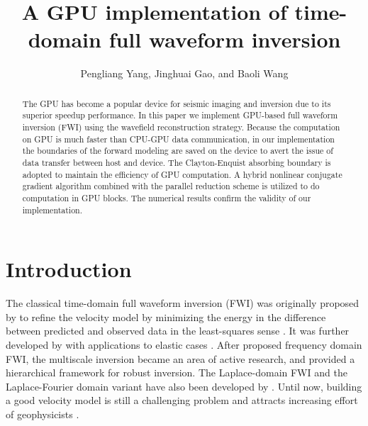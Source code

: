 
\renewcommand{\thefootnote}{\fnsymbol{footnote}}

\title{A GPU implementation of time-domain full waveform inversion}

\author{Pengliang Yang\footnotemark[1], Jinghuai Gao\footnotemark[1], and Baoli Wang\footnotemark[2]
}




\address{
\footnotemark[1]Xi'an Jiaotong University,\\ 
National Engineering Laboratory for Offshore Oil Exploration,\\
 Xi'an, China, 710049\\
ypl.2100@gmail.com, jhgao@mail.xjtu.edu.cn\\
\footnotemark[2]CCTEG  Xi'an Research Institute,\\
Xi'an, China, 710077\\
pooly1981@163.com
}

\maketitle

\begin{abstract}
The GPU has become a popular device for seismic imaging and inversion due to its superior speedup performance. In this paper we implement GPU-based full waveform inversion (FWI) using the wavefield reconstruction strategy. Because the computation on GPU is much faster than CPU-GPU data communication, in our implementation the boundaries of the forward modeling are saved on the device to avert the issue of data transfer between host and device. The Clayton-Enquist absorbing boundary is adopted to maintain the efficiency of GPU computation. A hybrid nonlinear conjugate gradient algorithm combined with the parallel reduction scheme is utilized to do computation in GPU blocks. The numerical results confirm the validity of our implementation. 

\end{abstract}


\section{Introduction}

The classical time-domain full waveform inversion (FWI) was originally proposed by \cite{tarantola1984inversion} to refine the velocity model by minimizing the energy in the difference between predicted and observed data in the least-squares sense \citep{symes2008migration}. It was further developed by \cite{tarantola1986strategy} with applications to elastic cases \citep{pica1990nonlinear}. 
After \cite{pratt1998gauss} proposed frequency domain FWI, the multiscale inversion became an area of active research, and provided a hierarchical framework for robust inversion. The Laplace-domain FWI and the Laplace-Fourier domain variant have also been developed by \cite{shin2008waveform,shin2009waveform}. Until now, building a good velocity model is still a challenging problem and attracts increasing effort of geophysicists \citep{virieux2009overview}. 

